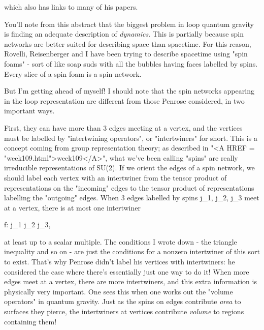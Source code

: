 which also has links to many of his papers.

You'll note from this abstract that the biggest problem in loop quantum
gravity is finding an adequate description of \emph{dynamics}.  This is
partially because spin networks are better suited for describing space
than spacetime.  For this reason, Rovelli, Reisenberger and I have been
trying to describe spacetime using "spin foams" - sort of like soap
suds with all the bubbles having faces labelled by spins.  Every slice
of a spin foam is a spin network.

But I'm getting ahead of myself!  I should note that the spin networks
appearing in the loop representation are different from those Penrose
considered, in two important ways.

First, they can have more than 3 edges meeting at a vertex, and the
vertices must be labelled by "intertwining operators", or "intertwiners"
for short.  This is a concept coming from group representation theory;
as described in "<A HREF = "week109.html">week109</A>", what we've been calling "spins" are really
irreducible representations of SU(2).  If we orient the edges of a spin
network, we should label each vertex with an intertwiner from the tensor
product of representations on the "incoming" edges to the 
tensor product
of representations labelling the "outgoing" edges.  When 3 edges
labelled by spins j_{1}, j_{2}, j_{3} meet at a vertex, there is at most one
intertwiner

                        f: j_{1} \otimes  j_{2} \to  j_{3}, 

at least up to a scalar multiple.  The conditions I wrote down - the
triangle inequality and so on - are just the conditions for a nonzero
intertwiner of this sort to exist.  That's why Penrose didn't label his
vertices with intertwiners: he considered the case where there's
essentially just one way to do it!  When more edges meet at a vertex,
there are more intertwiners, and this extra information is physically
very important.  One sees this when one works out the "volume operators"
in quantum gravity.  Just as the spins on edges contribute \emph{area} to
surfaces they pierce, the intertwiners at vertices contribute \emph{volume}
to regions containing them!

